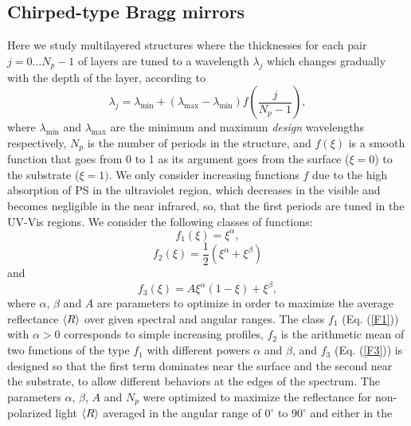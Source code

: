 \documentclass[a4paper,fleqn]{cas-sc}
\begin{document}
\subsection{Chirped-type Bragg mirrors}\label{ss:chirped}


Here we study multilayered structures where the thicknesses for each
pair $j=0\ldots N_p-1$ of layers are tuned to a wavelength $\lambda_j$ which changes
gradually with the depth of the layer, according to
\begin{equation}
        \lambda_{j}=\lambda_{\min }+\left(\lambda_{\max }-\lambda_{\min}\right) f\left(\frac{j}{N_p-1}\right),\label{Dis}
\end{equation}%
where $\lambda_{\min }$ and $\lambda_{\max }$ are the minimum and
maximum {\em design} wavelengths respectively, $N_p$ is the number of
periods  in the structure, and $f(\xi)$ is a smooth function that
goes from 0 to 1 as its argument goes from the surface ($\xi=0$) to the
substrate ($\xi=1)$. We only consider increasing functions $f$ due to
the high absorption of PS in the ultraviolet region, which decreases in
the visible and becomes negligible in the near infrared, so, that the first
periods are tuned in the UV-Vis regions. We consider the
following classes of functions:
\begin{equation}
        f_{1}\left(\xi \right) =\xi^{\alpha },  \label{F1}
\end{equation}
\begin{equation}
        f_{2}\left(\xi \right) =\frac{1}{2}\left(\xi^{\alpha }+\xi^{\beta}\right)
        \label{F2}
\end{equation}
and%
\begin{equation}
        f_{3}\left(\xi\right) =A\xi^{\alpha }\left(1-\xi\right) +\xi^{\beta },  \label{F3}
\end{equation}
where $\alpha$, $\beta$ and $A$ are parameters to optimize in order
to maximize the average reflectance $\braket{R}$ over given spectral
and angular ranges. The class
$f_{1}$ (Eq. (\ref {F1})) with  $\alpha>0$ corresponds to simple
increasing profiles, $f_2$ is the arithmetic mean
of two functions of the type $f_{1}$ with different
powers $\alpha$ and $\beta$, and $f_{3}$ (Eq. (\ref{F3})) is
designed so that the first term dominates near the surface and the
second near the substrate, to allow different behaviors
at the edges of the spectrum.
The parameters
$\alpha$, $\beta$, $A$ and $N_{p}$ were optimized to maximize the
reflectance for non-polarized light $\braket{R}$ averaged in the
angular range of $0^\circ$ to $90^\circ$ and either in the
\end{document}

